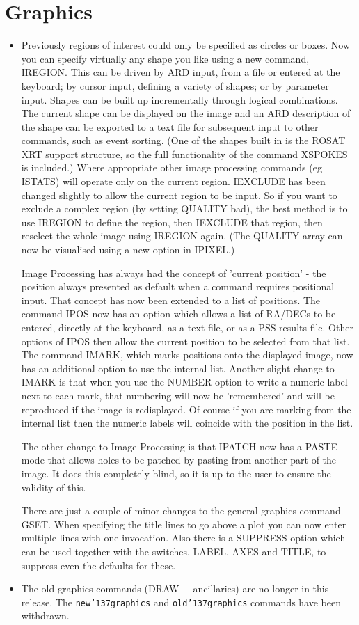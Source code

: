 \documentclass{book}
\renewcommand{\_}{{\tt\char'137}}     %
\begin{document}
\section{Graphics}
\begin{itemize}
\item Previously regions of interest could only be specified as circles
or boxes. Now you can specify virtually any shape you like
using a new command, IREGION. This can be driven by ARD input, from
a file or entered at the keyboard; by cursor input, defining a
variety of shapes; or by parameter input. Shapes can be built up
incrementally through logical combinations. The current shape can be
displayed on the image and an ARD description of the shape can be
exported to a text file for subsequent input to other commands, such
as event sorting. (One of the shapes built in is the ROSAT XRT
support structure, so the full functionality of the command XSPOKES
is included.) Where appropriate other image processing commands
(eg ISTATS) will operate only on the current region. IEXCLUDE has
been changed slightly to allow the current region to be input. So
if you want to exclude a complex region (by setting QUALITY bad), the
best method is to use IREGION to define the region, then IEXCLUDE
that region, then reselect the whole image using IREGION again.
(The QUALITY array can now be visualised using a new option in
IPIXEL.)
 
Image Processing has always had the concept of 'current position' - the
position always presented as default when a command requires positional
input. That concept has now been extended to a list of positions.
The command IPOS now has an option which allows a list of RA/DECs to
be entered, directly at the keyboard, as a text file, or as a PSS
results file. Other options of IPOS then allow the current position
to be selected from that list. The command IMARK, which marks positions
onto the displayed image, now has an additional option to use the
internal list. Another slight change to IMARK is that when you use
the NUMBER option to write a numeric label next to each mark, that
numbering will now be 'remembered' and will be reproduced if the image
is redisplayed. Of course if you are marking from the internal list
then the numeric labels will coincide with the position in the list.
 
The other change to Image Processing is that IPATCH now has a PASTE
mode that allows holes to be patched by pasting from another part of
the image. It does this completely blind, so it is up to the user
to ensure the validity of this.
 
There are just a couple of minor changes to the general graphics
command GSET. When specifying the title lines to go above a plot
you can now enter multiple lines with one invocation. Also there
is a SUPPRESS option which can be used together with the switches,
LABEL, AXES and TITLE, to suppress even the defaults for these.
 
\item The old graphics commands (DRAW + ancillaries) are no longer in this
release. The {\tt new\_graphics} and {\tt old\_graphics}
commands have been withdrawn.
 
\end{itemize}
\end{document}
